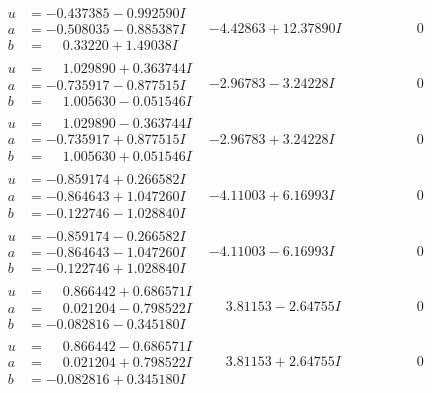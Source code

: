 \documentclass[1p]{elsarticle_modified}
\theoremstyle{definition}
\begin{document}
$$\begin{array}{c|c|c}
\begin{aligned}
u &= -0.437385 - 0.992590 I \\
a &= -0.508035 - 0.885387 I \\
b &= \phantom{-}0.33220 + 1.49038 I\end{aligned}
 & -4.42863 + 12.37890 I & \phantom{-0.000000 } 0 \\ \hline\begin{aligned}
u &= \phantom{-}1.029890 + 0.363744 I \\
a &= -0.735917 - 0.877515 I \\
b &= \phantom{-}1.005630 - 0.051546 I\end{aligned}
 & -2.96783 - 3.24228 I & \phantom{-0.000000 } 0 \\ \hline\begin{aligned}
u &= \phantom{-}1.029890 - 0.363744 I \\
a &= -0.735917 + 0.877515 I \\
b &= \phantom{-}1.005630 + 0.051546 I\end{aligned}
 & -2.96783 + 3.24228 I & \phantom{-0.000000 } 0 \\ \hline\begin{aligned}
u &= -0.859174 + 0.266582 I \\
a &= -0.864643 + 1.047260 I \\
b &= -0.122746 - 1.028840 I\end{aligned}
 & -4.11003 + 6.16993 I & \phantom{-0.000000 } 0 \\ \hline\begin{aligned}
u &= -0.859174 - 0.266582 I \\
a &= -0.864643 - 1.047260 I \\
b &= -0.122746 + 1.028840 I\end{aligned}
 & -4.11003 - 6.16993 I & \phantom{-0.000000 } 0 \\ \hline\begin{aligned}
u &= \phantom{-}0.866442 + 0.686571 I \\
a &= \phantom{-}0.021204 - 0.798522 I \\
b &= -0.082816 - 0.345180 I\end{aligned}
 & \phantom{-}3.81153 - 2.64755 I & \phantom{-0.000000 } 0 \\ \hline\begin{aligned}
u &= \phantom{-}0.866442 - 0.686571 I \\
a &= \phantom{-}0.021204 + 0.798522 I \\
b &= -0.082816 + 0.345180 I\end{aligned}
 & \phantom{-}3.81153 + 2.64755 I & \phantom{-0.000000 } 0 \\ \hline\begin{aligned}

\end{aligned}
\end{array}$$
\end{document}
